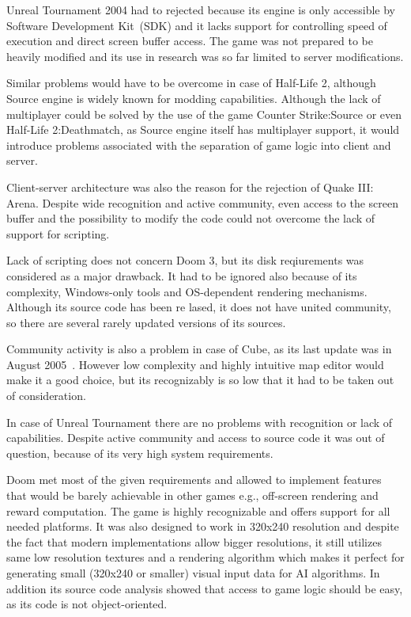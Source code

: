 Unreal Tournament 2004 had to rejected because its engine is only accessible by Software Development Kit~(SDK) and it lacks support for controlling speed of execution and direct screen buffer access.
The game was not prepared to be heavily modified and its use in research was so far limited to server modifications.

Similar problems would have to be overcome in case of Half-Life 2, although Source engine is widely known for modding capabilities.
Although the lack of multiplayer could be solved by the use of the game Counter Strike:Source or even Half-Life 2:Deathmatch, as Source engine itself has multiplayer support, it would introduce problems associated with the separation of game logic into client and server.

Client-server architecture was also the reason for the rejection of Quake III: Arena.
Despite wide recognition and active community, even access to the screen buffer and the possibility to modify the code could not overcome the lack of support for scripting.

Lack of scripting does not concern Doom 3, but its disk reqiurements was considered as a major drawback.
It had to be ignored also because of its complexity, Windows-only tools and OS-dependent rendering mechanisms.
Although its source code has been re lased, it does not have united community, so there are several rarely updated versions of its sources.

Community activity is also a problem in case of Cube, as its last update was in August 2005~\cite{cube}.
However low complexity and highly intuitive map editor would make it a good choice, but its recognizably is so low that it had to be taken out of consideration. 

In case of Unreal Tournament there are no problems with recognition or lack of capabilities.
Despite active community and access to source code it was out of question, because of its very high system requirements.




Doom met most of the given requirements and allowed to implement features that would be barely achievable in other games e.g., off-screen rendering and reward computation.
The game is highly recognizable and offers support for all needed platforms.
It was also designed to work in 320x240 resolution and despite the fact that modern implementations allow bigger resolutions, it still utilizes same low resolution textures and a rendering algorithm which makes it perfect for generating small (320x240 or smaller) visual input data for AI algorithms.
In addition its source code analysis showed that access to game logic should be easy, as its code is not object-oriented.

